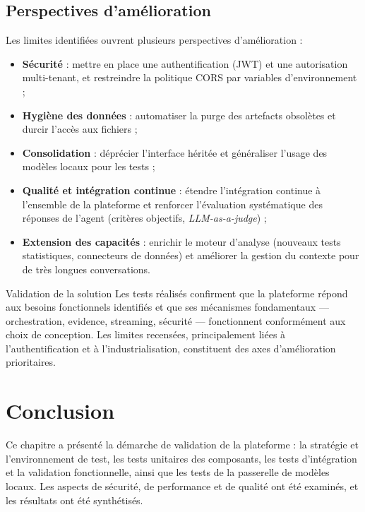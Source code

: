 \subsection{Perspectives d'amélioration}

Les limites identifiées ouvrent plusieurs perspectives d'amélioration :

\begin{itemize}
  \item \textbf{Sécurité} : mettre en place une authentification (JWT) et une autorisation multi-tenant, et restreindre la politique CORS par variables d'environnement ;
  \item \textbf{Hygiène des données} : automatiser la purge des artefacts obsolètes et durcir l'accès aux fichiers ;
  \item \textbf{Consolidation} : déprécier l'interface héritée et généraliser l'usage des modèles locaux pour les tests ;
  \item \textbf{Qualité et intégration continue} : étendre l'intégration continue à l'ensemble de la plateforme et renforcer l'évaluation systématique des réponses de l'agent (critères objectifs, \textit{LLM-as-a-judge}) ;
  \item \textbf{Extension des capacités} : enrichir le moteur d'analyse (nouveaux tests statistiques, connecteurs de données) et améliorer la gestion du contexte pour de très longues conversations.
\end{itemize}

\begin{resultbox}{Validation de la solution}
Les tests réalisés confirment que la plateforme répond aux besoins fonctionnels identifiés et que ses mécanismes fondamentaux — orchestration, evidence, streaming, sécurité — fonctionnent conformément aux choix de conception. Les limites recensées, principalement liées à l'authentification et à l'industrialisation, constituent des axes d'amélioration prioritaires.
\end{resultbox}

\section{Conclusion}

Ce chapitre a présenté la démarche de validation de la plateforme : la stratégie et l'environnement de test, les tests unitaires des composants, les tests d'intégration et la validation fonctionnelle, ainsi que les tests de la passerelle de modèles locaux. Les aspects de sécurité, de performance et de qualité ont été examinés, et les résultats ont été synthétisés.

